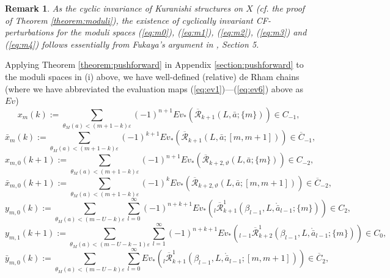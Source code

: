 \documentclass[a4paper]{article}
\newtheorem{remark}[theorem]{Remark}
\numberwithin{equation}{section}
\begin{document}
\begin{remark}\label{remark:CF}
As the cyclic invariance of Kuranishi structures on $X$ (cf. the proof of Theorem \ref{theorem:moduli}), the existence of cyclically invariant CF-perturbations for the moduli spaces (\ref{eq:m0}), (\ref{eq:m1}), (\ref{eq:m2}), (\ref{eq:m3}) and (\ref{eq:m4}) follows essentially from Fukaya's argument in \cite{kfc}, Section 5.
\end{remark}

Applying Theorem \ref{theorem:pushforward} in Appendix \ref{section:pushforward} to the moduli spaces in (i) above, we have well-defined (relative) de Rham chains (where we have abbreviated the evaluation maps (\ref{eq:ev1})---(\ref{eq:ev6}) above as $\mathit{Ev}$)
\begin{equation}\label{eq:c1}
x_m(k):=\sum_{\theta_M(a)<(m+1-k)\varepsilon}(-1)^{n+1}\mathit{Ev}_\ast\left(\overline{\mathcal{R}}_{k+1}(L,\bar{a};\{m\})\right)\in C_{-1},
\end{equation}
\begin{equation}\label{eq:c2}
\bar{x}_m(k):=\sum_{\theta_M(a)<(m+1-k)\varepsilon}(-1)^{k+1}\mathit{Ev}_\ast\left(\overline{\mathcal{R}}_{k+1}(L,\bar{a};[m,m+1])\right)\in\overline{C}_{-1},
\end{equation}
\begin{equation}\label{eq:c3}
x_{m,0}(k+1):=\sum_{\theta_M(a)<(m+1-k)\varepsilon}(-1)^{n+1}\mathit{Ev}_\ast\left(\overline{\mathcal{R}}_{k+2,\vartheta}(L,\bar{a};\{m\})\right)\in C_{-2},
\end{equation}
\begin{equation}\label{eq:c4}
\bar{x}_{m,0}(k+1):=\sum_{\theta_M(a)<(m+1-k)\varepsilon}(-1)^k\mathit{Ev}_\ast\left(\overline{\mathcal{R}}_{k+2,\vartheta}(L,\bar{a};[m,m+1])\right)\in\overline{C}_{-2},
\end{equation}
\begin{equation}\label{eq:c5}
y_{m,0}(k):=\sum_{\theta_M(a)<(m-U-k)\varepsilon}\sum_{l=0}^\infty(-1)^{n+k+1}\mathit{Ev}_\ast\left({}_l\overline{\mathcal{R}}_{k+1}^1(\beta_{l-1},L,\ring{\bar{a}}_{l-1};\{m\})\right)\in C_2,
\end{equation}
\begin{equation}\label{eq:c6}
y_{m,1}(k+1):=\sum_{\theta_M(a)<(m-U-k-1)\varepsilon}\sum_{l=1}^\infty(-1)^{n+k+1}\mathit{Ev}_\ast\left({}_{l-1}\overline{\mathcal{R}}_{k+2}^1(\beta_{l-1},L,\ring{\bar{a}}_{l-1};\{m\})\right)\in C_0,
\end{equation}
\begin{equation}\label{eq:c7}
\bar{y}_{m,0}(k):=\sum_{\theta_M(a)<(m-U-k)\varepsilon}\sum_{l=0}^\infty\mathit{Ev}_\ast\left({}_l\overline{\mathcal{R}}_{k+1}^1(\beta_{l-1},L,\ring{\bar{a}}_{l-1};[m,m+1])\right)\in\overline{C}_2,
\end{equation}
\end{document}
